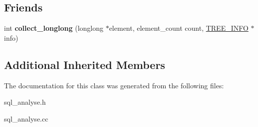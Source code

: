 \subsection*{Friends}
\begin{DoxyCompactItemize}
\item 
\mbox{\label{classfield__longlong_ad5929e78c0f349f7652885694d33b67d}} 
int {\bfseries collect\+\_\+longlong} (longlong $\ast$element, element\+\_\+count count, \mbox{\hyperlink{structst__tree__info}{T\+R\+E\+E\+\_\+\+I\+N\+FO}} $\ast$info)
\end{DoxyCompactItemize}
\subsection*{Additional Inherited Members}


The documentation for this class was generated from the following files\+:\begin{DoxyCompactItemize}
\item 
sql\+\_\+analyse.\+h\item 
sql\+\_\+analyse.\+cc\end{DoxyCompactItemize}
